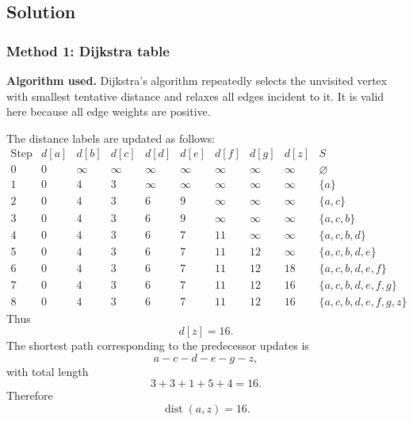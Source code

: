 \documentclass[12pt]{article}
\DeclareMathOperator{\dist}{dist}
\begin{document}
\subsection{Solution}

\subsubsection{Method 1: Dijkstra table}
\textbf{Algorithm used.} Dijkstra's algorithm repeatedly selects the unvisited vertex with smallest tentative distance and relaxes all edges incident to it. It is valid here because all edge weights are positive.

The distance labels are updated as follows:
\[
\renewcommand{\arraystretch}{1.25}
\begin{array}{c|cccccccc|l}
\text{Step} & d[a]&d[b]&d[c]&d[d]&d[e]&d[f]&d[g]&d[z] & S\\ \hline
0 & 0&\infty&\infty&\infty&\infty&\infty&\infty&\infty&\varnothing\\
1 & 0&4&3&\infty&\infty&\infty&\infty&\infty&\{a\}\\
2 & 0&4&3&6&9&\infty&\infty&\infty&\{a,c\}\\
3 & 0&4&3&6&9&\infty&\infty&\infty&\{a,c,b\}\\
4 & 0&4&3&6&7&11&\infty&\infty&\{a,c,b,d\}\\
5 & 0&4&3&6&7&11&12&\infty&\{a,c,b,d,e\}\\
6 & 0&4&3&6&7&11&12&18&\{a,c,b,d,e,f\}\\
7 & 0&4&3&6&7&11&12&16&\{a,c,b,d,e,f,g\}\\
8 & 0&4&3&6&7&11&12&16&\{a,c,b,d,e,f,g,z\}
\end{array}
\]
Thus
\[
  d[z]=16.
\]
The shortest path corresponding to the predecessor updates is
\[
  a-c-d-e-g-z,
\]
with total length
\[
  3+3+1+5+4=16.
\]
Therefore
\[
  \boxed{\dist(a,z)=16.}
\]
\end{document}
